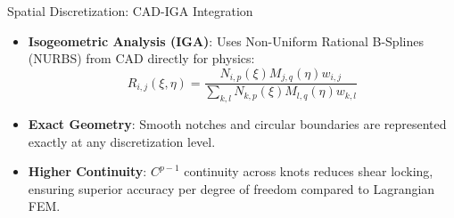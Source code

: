 \documentclass[aspectratio=169, 10pt]{beamer}
\begin{document}
\begin{frame}{Spatial Discretization: CAD-IGA Integration}
    \begin{itemize}
        \item \textbf{Isogeometric Analysis (IGA)}: Uses Non-Uniform Rational B-Splines (NURBS) from CAD directly for physics:
        \begin{equation*}
            R_{i,j}(\xi, \eta) = \frac{N_{i,p}(\xi) M_{j,q}(\eta) w_{i,j}}{\sum_{k,l} N_{k,p}(\xi) M_{l,q}(\eta) w_{k,l}}
        \end{equation*}
        \item \textbf{Exact Geometry}: Smooth notches and circular boundaries are represented exactly at any discretization level.
        \item \textbf{Higher Continuity}: $C^{p-1}$ continuity across knots reduces shear locking, ensuring superior accuracy per degree of freedom compared to Lagrangian FEM.
    \end{itemize}
    \centering
    \vspace{0.1cm}
\end{frame}
\end{document}
